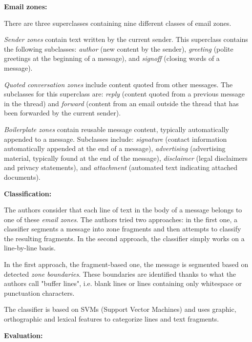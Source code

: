 \documentclass[11pt]{article}
\begin{document}
\vspace{0.5cm}
\textbf{Email zones:}
\vspace{0.1cm}

There are three superclasses containing nine different classes of email zones.

\textit{Sender zones} contain text written by the current sender. This superclass contains the following subclasses: \textit{author} (new content by the sender), \textit{greeting} (polite greetings at the beginning of a message), and \textit{signoff} (closing words of a message).

\textit{Quoted conversation zones} include content quoted from other messages. The subclasses for this superclass are: \textit{reply} (content quoted from a previous message in the thread) and \textit{forward} (content from an email outside the thread that has been forwarded by the current sender).

\textit{Boilerplate zones} contain reusable message content, typically automatically appended to a message. Subclasses include: \textit{signature} (contact information automatically appended at the end of a message), \textit{advertising} (advertising material, typically found at the end of the message), \textit{disclaimer} (legal disclaimers and privacy statements), and \textit{attachment} (automated text indicating attached documents).

\vspace{0.5cm}
\textbf{Classification:}
\vspace{0.1cm}

The authors consider that each line of text in the body of a message belongs to one of these \textit{email zones}. The authors tried two approaches: in the first one, a classifier segments a message into zone fragments and then attempts to classify the resulting fragments. In the second approach, the classifier simply works on a line-by-line basis.

In the first approach, the fragment-based one, the message is segmented based on detected \textit{zone boundaries}. These boundaries are identified thanks to what the authors call "buffer lines", i.e. blank lines or lines containing only whitespace or punctuation characters.

The classifier is based on SVMs (Support Vector Machines) and uses graphic, orthographic and lexical features to categorize lines and text fragments.

\vspace{0.5cm}
\textbf{Evaluation:}
\vspace{0.1cm}
\end{document}
